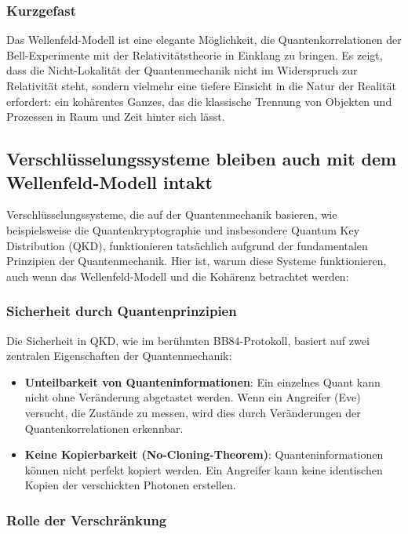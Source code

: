 \documentclass[12pt,a4paper]{article}
\begin{document}
	\subsubsection{Kurzgefast}
	
	Das Wellenfeld-Modell ist eine elegante Möglichkeit, die Quantenkorrelationen der Bell-Experimente mit der Relativitätstheorie in Einklang zu bringen. Es zeigt, dass die Nicht-Lokalität der Quantenmechanik nicht im Widerspruch zur Relativität steht, sondern vielmehr eine tiefere Einsicht in die Natur der Realität erfordert: ein kohärentes Ganzes, das die klassische Trennung von Objekten und Prozessen in Raum und Zeit hinter sich lässt.
	\subsection{Verschlüsselungssysteme bleiben auch mit dem Wellenfeld-Modell intakt}
	
	Verschlüsselungssysteme, die auf der Quantenmechanik basieren, wie beispielsweise die Quantenkryptographie und insbesondere Quantum Key Distribution (QKD), funktionieren tatsächlich aufgrund der fundamentalen Prinzipien der Quantenmechanik. Hier ist, warum diese Systeme funktionieren, auch wenn das Wellenfeld-Modell und die Kohärenz betrachtet werden:
	
	\subsubsection{Sicherheit durch Quantenprinzipien}
	
	Die Sicherheit in QKD, wie im berühmten BB84-Protokoll, basiert auf zwei zentralen Eigenschaften der Quantenmechanik:
	\begin{itemize}
		\item \textbf{Unteilbarkeit von Quanteninformationen}: Ein einzelnes Quant kann nicht ohne Veränderung abgetastet werden. Wenn ein Angreifer (Eve) versucht, die Zustände zu messen, wird dies durch Veränderungen der Quantenkorrelationen erkennbar.
		\item \textbf{Keine Kopierbarkeit (No-Cloning-Theorem)}: Quanteninformationen können nicht perfekt kopiert werden. Ein Angreifer kann keine identischen Kopien der verschickten Photonen erstellen.
	\end{itemize}
	
	\subsubsection{Rolle der Verschränkung}
	
\end{document}
